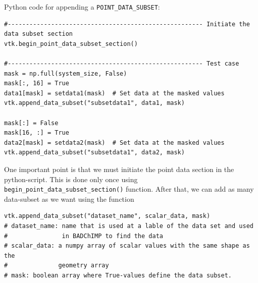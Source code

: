 \documentclass[11pt,a4paper]{report}
\begin{document}
Python code for appending a \texttt{POINT{\_}DATA{\_}SUBSET}:
\begin{verbatim}
#------------------------------------------------------ Initiate the data subset section
vtk.begin_point_data_subset_section()

#------------------------------------------------------ Test case
mask = np.full(system_size, False)
mask[:, 16] = True
data1[mask] = setdata1(mask)  # Set data at the masked values 
vtk.append_data_subset("subsetdata1", data1, mask)

mask[:] = False
mask[16, :] = True
data2[mask] = setdata2(mask)  # Set data at the masked values 
vtk.append_data_subset("subsetdata1", data2, mask)
\end{verbatim} 
One important point is that we must initiate the point data section in the python-script. This is done only once using \texttt{begin{\_}point{\_}data{\_}subset{\_}section()} function. After that, we can add as many data-subset as we want using the function
\begin{verbatim}
vtk.append_data_subset("dataset_name", scalar_data, mask)
# dataset_name: name that is used at a lable of the data set and used 
#               in BADChIMP to find the data
# scalar_data: a numpy array of scalar values with the same shape as the 
#              geometry array
# mask: boolean array where True-values define the data subset.
\end{verbatim}
\end{document}
